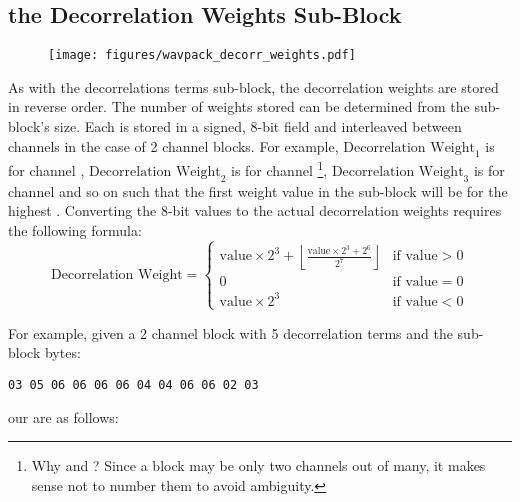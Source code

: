 \subsection{the Decorrelation Weights Sub-Block}
\begin{figure}[h]
\texttt{[image: figures/wavpack\_decorr\_weights.pdf]}
\end{figure}
\par
\noindent
As with the decorrelations terms sub-block,
the decorrelation weights are stored in reverse order.
The number of weights stored can be determined from the sub-block's
size.
Each is stored in a signed, 8-bit field and interleaved between
channels in the case of 2 channel blocks.
For example, $\text{Decorrelation Weight}_1$ is for channel ,
$\text{Decorrelation Weight}_2$ is for channel
\footnote{Why  and ?
Since a block may be only two channels out of many,
it makes sense not to number them to avoid ambiguity.},
$\text{Decorrelation Weight}_3$ is for channel  and so on
such that the first weight value in the sub-block will be for the highest
.
Converting the 8-bit values to the actual decorrelation weights
requires the following formula:
\begin{equation*}
\text{Decorrelation Weight} =
\begin{cases}
\text{value} \times 2 ^ 3 + \left\lfloor\frac{\text{value} \times 2 ^ 3 + 2 ^ 6}{2 ^ 7}\right\rfloor & \text{if value} > 0 \\
0 & \text{if value} = 0 \\
\text{value} \times 2 ^ 3 & \text{if value} < 0
\end{cases}
\end{equation*}
\par
\noindent
For example, given a 2 channel block with 5 decorrelation terms and the
sub-block bytes:
\begin{Verbatim}[frame=single]
03 05 06 06 06 06 04 04 06 06 02 03
\end{Verbatim}
our  are as follows:
